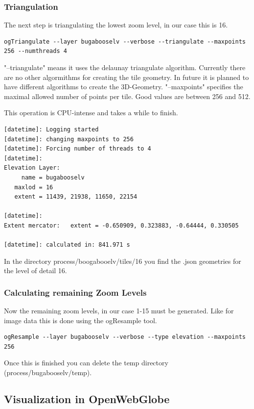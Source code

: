 \documentclass[
	12pt,
	a4paper,
	english,	
	appendixprefix,				     			        
	openany,		     	
	abstracton,		    		    
 	BCOR8mm,		    
]{scrartcl}
\begin{document}
\subsubsection{Triangulation}

The next step is triangulating the lowest zoom level, in our case this is 16.

\begin{lstlisting}
ogTriangulate --layer bugabooselv --verbose --triangulate --maxpoints 256 --numthreads 4
\end{lstlisting}

"--triangulate" means it uses the delaunay triangulate algorithm. Currently there are no other algormithms for creating the tile geometry. In future it is planned to have different algorithms to create the 3D-Geometry.
"--maxpoints" specifies the maximal allowed number of points per tile. Good values are between 256 and 512.

This operation is CPU-intense and takes a while to finish.

\begin{lstlisting}
[datetime]: Logging started
[datetime]: changing maxpoints to 256
[datetime]: Forcing number of threads to 4
[datetime]:
Elevation Layer:
     name = bugabooselv
   maxlod = 16
   extent = 11439, 21938, 11650, 22154

[datetime]:
Extent mercator:   extent = -0.650909, 0.323883, -0.64444, 0.330505

[datetime]: calculated in: 841.971 s
\end{lstlisting}

In the directory process/boogabooelv/tiles/16 you find the .json geometries for the level of detail 16.

\subsubsection{Calculating remaining Zoom Levels}

Now the remaining zoom levels, in our case 1-15 must be generated. Like for image data this is done using the ogResample tool.

\begin{lstlisting}
ogResample --layer bugabooselv --verbose --type elevation --maxpoints 256
\end{lstlisting}

Once this is finished you can delete the temp directory (process/bugabooselv/temp).

\subsection{Visualization in OpenWebGlobe}
\end{document}
